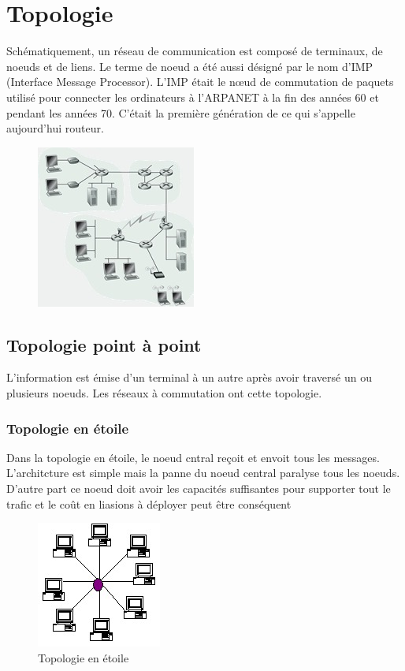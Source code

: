 \chapter{Topologie}
Schématiquement, un réseau de communication est composé de terminaux, de noeuds et de liens. Le terme de noeud a été aussi désigné par le nom d'IMP (Interface Message Processor). L'IMP était le n\oe{}ud de commutation de paquets utilisé pour connecter les ordinateurs à l'ARPANET à la fin des années 60 et pendant les années 70. C'était la première génération de ce qui s'appelle aujourd'hui routeur.
\begin{figure}[H]
	\centering
	\includegraphics{partie1/reseauschema.jpg}
\end{figure}
\section{Topologie point à point}
L'information est émise d'un terminal à un autre après avoir traversé un ou plusieurs noeuds. Les réseaux à commutation ont cette topologie.
	\subsection{Topologie en étoile}
	Dans la topologie en étoile, le noeud cntral reçoit et envoit tous les messages. L'architcture est simple mais la panne du noeud central paralyse tous les noeuds. D'autre part ce noeud doit avoir les capacités suffisantes pour supporter tout le trafic et le coût en liasions à déployer peut être conséquent
\begin{figure}[H]
	\centering
	\includegraphics{partie1/topoetoile.jpg}
	\caption{Topologie en étoile}
\end{figure}
